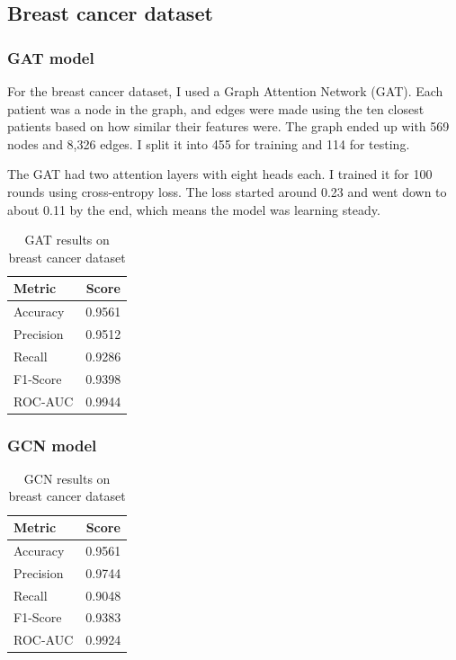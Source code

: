 \documentclass[12pt]{article}
\begin{document}
\subsection{Breast cancer dataset}
\subsubsection{GAT model}

For the breast cancer dataset, I used a Graph Attention Network (GAT). Each patient was a node in the graph, and edges were made using the ten closest patients based on how similar their features were. The graph ended up with 569 nodes and 8,326 edges. I split it into 455 for training and 114 for testing.

The GAT had two attention layers with eight heads each. I trained it for 100 rounds using cross-entropy loss. The loss started around 0.23 and went down to about 0.11 by the end, which means the model was learning steady.

\begin{table}[H]
\centering
\caption{GAT results on breast cancer dataset}
\begin{tabular}{|l|c|}
\hline
\textbf{Metric} & \textbf{Score} \\
\hline
Accuracy  & 0.9561 \\
Precision & 0.9512 \\
Recall    & 0.9286 \\
F1-Score  & 0.9398 \\
ROC-AUC   & 0.9944 \\
\hline
\end{tabular}
\end{table}


\subsubsection{GCN model}

\begin{table}[H]
\centering
\caption{GCN results on breast cancer dataset}
\begin{tabular}{|l|c|}
\hline
\textbf{Metric} & \textbf{Score} \\
\hline
Accuracy  & 0.9561 \\
Precision & 0.9744 \\
Recall    & 0.9048 \\
F1-Score  & 0.9383 \\
ROC-AUC   & 0.9924 \\
\hline
\end{tabular}

\end{table}
\end{document}
